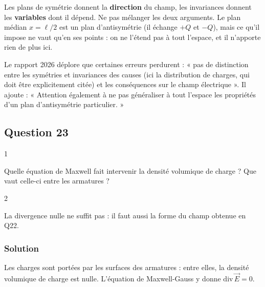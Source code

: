 \documentclass[11pt,a4paper]{article}
\begin{document}
\begin{piege}

Les plans de symétrie donnent la \textbf{direction} du champ, les invariances donnent les \textbf{variables} dont il dépend. Ne pas mélanger les deux arguments. Le plan médian \(x=\ell/2\) est un plan d'antisymétrie (il échange \(+Q\) et \(-Q\)), mais ce qu'il impose ne vaut qu'en ses points : on ne l'étend pas à tout l'espace, et il n'apporte rien de plus ici.

\end{piege}

\begin{jury}

Le rapport 2026 déplore que certaines erreurs perdurent : « pas de distinction entre les symétries et invariances des causes (ici la distribution de charges, qui doit être explicitement citée) et les conséquences sur le champ électrique ». Il ajoute : « Attention également à ne pas généraliser à tout l'espace les propriétés d'un plan d'antisymétrie particulier. »

\end{jury}

\hypertarget{question-23}{%
\subsection{Question 23}\label{question-23}}

\begin{indication}{1}

Quelle équation de Maxwell fait intervenir la densité volumique de charge ? Que vaut celle-ci entre les armatures ?

\end{indication}

\begin{indication}{2}

La divergence nulle ne suffit pas : il faut aussi la forme du champ obtenue en Q22.

\end{indication}

\hypertarget{solution-22}{%
\subsubsection{Solution}\label{solution-22}}

Les charges sont portées par les surfaces des armatures : entre elles, la densité volumique de charge est nulle. L'équation de Maxwell-Gauss y donne \(\mathrm{div}\,\vec E=0\).
\end{document}
